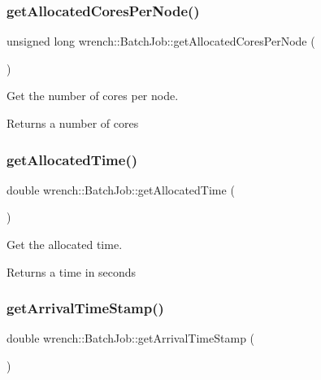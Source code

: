 \subsubsection{\texorpdfstring{get\+Allocated\+Cores\+Per\+Node()}{getAllocatedCoresPerNode()}}
{\footnotesize\ttfamily unsigned long wrench\+::\+Batch\+Job\+::get\+Allocated\+Cores\+Per\+Node (\begin{DoxyParamCaption}{ }\end{DoxyParamCaption})}



Get the number of cores per node. 

\begin{DoxyReturn}{Returns}
a number of cores 
\end{DoxyReturn}
\mbox{\label{classwrench_1_1_batch_job_a62b2b87b1f2b494d2598b30c3193d6d1}} 
\subsubsection{\texorpdfstring{get\+Allocated\+Time()}{getAllocatedTime()}}
{\footnotesize\ttfamily double wrench\+::\+Batch\+Job\+::get\+Allocated\+Time (\begin{DoxyParamCaption}{ }\end{DoxyParamCaption})}



Get the allocated time. 

\begin{DoxyReturn}{Returns}
a time in seconds 
\end{DoxyReturn}
\mbox{\label{classwrench_1_1_batch_job_a287fb8f69b4fecd1608cce0845f70951}} 
\subsubsection{\texorpdfstring{get\+Arrival\+Time\+Stamp()}{getArrivalTimeStamp()}}
{\footnotesize\ttfamily double wrench\+::\+Batch\+Job\+::get\+Arrival\+Time\+Stamp (\begin{DoxyParamCaption}{ }\end{DoxyParamCaption})}



